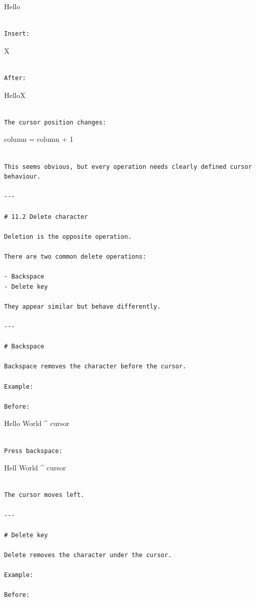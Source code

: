 \documentclass[
  oneside,
  openany]{book}
\begin{document}
Hello\textbar{}

\begin{verbatim}

Insert:
\end{verbatim}

X

\begin{verbatim}

After:
\end{verbatim}

HelloX\textbar{}

\begin{verbatim}

The cursor position changes:
\end{verbatim}

column = column + 1

\begin{verbatim}

This seems obvious, but every operation needs clearly defined cursor behaviour.

---

# 11.2 Delete character

Deletion is the opposite operation.

There are two common delete operations:

- Backspace
- Delete key

They appear similar but behave differently.

---

# Backspace

Backspace removes the character before the cursor.

Example:

Before:
\end{verbatim}

Hello World \^{} cursor

\begin{verbatim}

Press backspace:
\end{verbatim}

Hell World \^{} cursor

\begin{verbatim}

The cursor moves left.

---

# Delete key

Delete removes the character under the cursor.

Example:

Before:
\end{verbatim}
\end{document}
